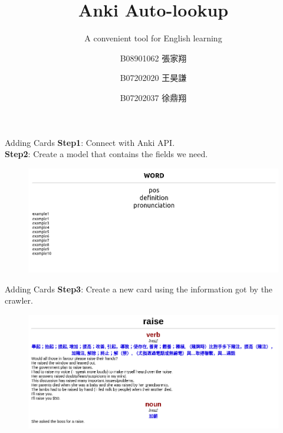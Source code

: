 \documentclass{beamer}
\title{Anki Auto-lookup}
\subtitle{A convenient tool for English learning}
\author[張家翔, 王昊謙, 徐鼎翔]
{B08901062 張家翔\inst{1} \and 
B07202020 王昊謙\inst{2} \and 
B07202037 徐鼎翔 \inst{2}}
\institute[NTU] %
{
	\inst{1}%
	Department of Electrical Engineering\\
	National Taiwan University
	\and
	\inst{2}%
	Department of Physics\\
	National Taiwan University
}
\begin{document}
\frame{\titlepage} 

\begin{frame}{Adding Cards}
	\textbf{Step1}: Connect with Anki API.\\
	\textbf{Step2}: Create a model that contains the fields we need.
	\begin{figure}[h]
			\centering
			\includegraphics[width=1.00\linewidth]{./model_example.png}
	\end{figure}
\end{frame}

\begin{frame}{Adding Cards}
	\textbf{Step3}: Create a new card using the information got by the crawler.
	\begin{figure}[h]
			\centering
			\includegraphics[width=1.0\linewidth]{./card_sample.png}
	\end{figure}
\end{frame}
\end{document}
